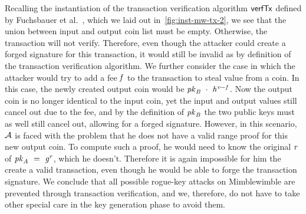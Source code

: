 Recalling the instantiation of the transaction verification algorithm $\mathsf{verfTx}$ defined by Fuchsbauer et al.~\cite{fuchsbauer2019aggregate}, which we laid out in~\cref{fig:inst-mw-tx-2}, we see that the union between input and output coin list must be empty.
Otherwise, the transaction will not verify.
Therefore, even though the attacker could create a forged signature for this transaction, it would still be invalid as by definition of the transaction verification algorithm.
We further consider the case in which the attacker would try to add a fee $\mathit{f}$ to the transaction to steal value from a coin.
In this case, the newly created output coin would be $\mathit{pk}_{\mathit{B}} ~\cdot~ \mathit{h}^{\mathit{v} - \mathit{f}}$.
Now the output coin is no longer identical to the input coin, yet the input and output values still cancel out due to the fee, and by the definition of $\mathit{pk}_{\mathit{B}}$ the two public keys must as well still cancel out, allowing for a forged signature.
However, in this scenario, $\mathcal{A}$ is faced with the problem that he does not have a valid range proof for this new output coin.
To compute such a proof, he would need to know the original $\mathit{r}$ of $\mathit{pk}_{\mathit{A}} ~=~ \mathit{g}^{\mathit{r}}$, which he doesn't.
Therefore it is again impossible for him the create a valid transaction, even though he would be able to forge the transaction signature.
We conclude that all possible rogue-key attacks on Mimblewimble are prevented through transaction verification, and we, therefore, do not have to take other special care in the key generation phase to avoid them.



